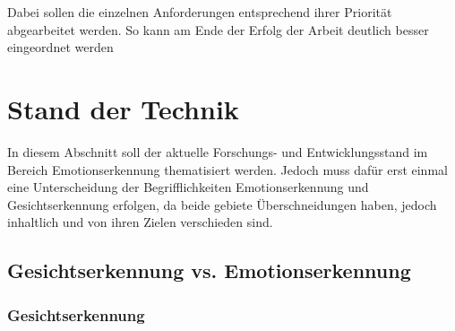 \documentclass[12pt, a4paper]{scrbook}
\begin{document}
Dabei sollen die einzelnen Anforderungen entsprechend ihrer Priorität abgearbeitet werden. So kann am Ende der Erfolg der Arbeit deutlich besser eingeordnet werden

\let\cleardoublepage\relax

\chapter{Stand der Technik}
In diesem Abschnitt soll der aktuelle Forschungs- und Entwicklungsstand im Bereich Emotionserkennung thematisiert werden. Jedoch muss dafür erst einmal eine Unterscheidung der Begrifflichkeiten
Emotionserkennung und Gesichtserkennung erfolgen, da beide gebiete Überschneidungen haben, jedoch inhaltlich und von ihren Zielen verschieden sind.
\section{Gesichtserkennung vs. Emotionserkennung}
\subsection{Gesichtserkennung}
\end{document}
